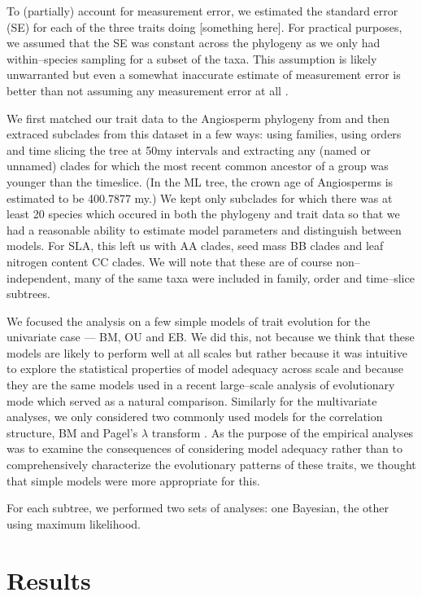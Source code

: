 \documentclass[a4paper,12pt]{article}
\begin{document}
To (partially) account for measurement error, we estimated the standard error (SE) for each of the three traits doing [something here]. For practical purposes, we assumed that the SE was constant across the phylogeny as we only had within--species sampling for a subset of the taxa. This assumption is likely unwarranted but even a somewhat inaccurate estimate of measurement error is better than not assuming any measurement error at all \citep{HarmonLosos2005}.

We first matched our trait data to the Angiosperm phylogeny from \citet{Zanne2013} and then extraced subclades from this dataset in a few ways: using families, using orders and time slicing the tree at 50my intervals and extracting any (named or unnamed) clades for which the most recent common ancestor of a group was younger than the timeslice. (In the ML tree, the crown age of Angiosperms is estimated to be 400.7877 my.) We kept only subclades for which there was at least 20 species which occured in both the phylogeny and trait data so that we had a reasonable ability to estimate model parameters and distinguish between models. For SLA, this left us with AA clades, seed mass BB clades and leaf nitrogen content CC clades. We will note that these are of course non--independent, many of the same taxa were included in family, order and time--slice subtrees. 

We focused the analysis on a few simple models of trait evolution for the univariate case --- BM, OU and EB. We did this, not because we think that these models are likely to perform well at all scales but rather because it was intuitive to explore the statistical properties of model adequacy across scale and because they are the same models used in a recent large--scale analysis of evolutionary mode \citep{Harmon2010} which served as a natural comparison. Similarly for the multivariate analyses, we only considered two commonly used models for the correlation structure, BM and Pagel's $\lambda$ transform \citep{Pagel1997} \citep[see, for example][]{Freckleton2009, Revell2010}. As the purpose of the empirical analyses was to examine the consequences of considering model adequacy rather than to comprehensively characterize the evolutionary patterns of these traits, we thought that simple models were more appropriate for this.

For each subtree, we performed two sets of analyses: one Bayesian, the other using maximum likelihood. 

\section*{Results}
\end{document}
